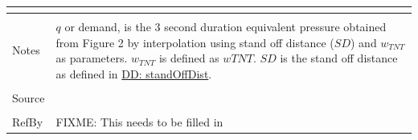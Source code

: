 \documentclass[12pt]{article}
\begin{document}
\begin{minipage}{\textwidth}
\begin{tabular}{p{} p{}}
\begin{symbDescription}
              \end{symbDescription}
\\ \midrule \\
Notes & $q$ or demand, is the 3 second duration equivalent pressure obtained from Figure 2 by interpolation using stand off distance ($SD$) and ${w_{TNT}}$ as parameters. ${w_{TNT}}$ is defined as $w TNT$. $SD$ is the stand off distance as defined in \hyperref[DD:standOffDist]{DD: standOffDist}.
\\ \midrule \\
Source & \cite{astm2009}
\\ \midrule \\
RefBy & FIXME: This needs to be filled in
\\ \bottomrule \end{tabular}
\end{minipage}\\
\end{document}
